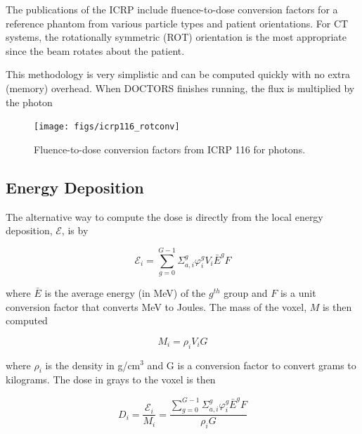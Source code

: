 The publications of the ICRP include fluence-to-dose conversion factors for a reference phantom from various particle types and patient orientations. For CT systems, the rotationally symmetric (ROT) orientation is the most appropriate since the beam rotates about the patient.

This methodology is very simplistic and can be computed quickly with no extra (memory) overhead. When DOCTORS finishes running, the flux is multiplied by the photon 

\begin{figure}[tb]
  \begin{center}
   \texttt{[image: figs/icrp116\_rotconv]}
  \end{center}
  \caption{Fluence-to-dose conversion factors from ICRP 116 for photons.}
\label{fig:icrp116_rotconv}
\end{figure}

\subsection{Energy Deposition}

The alternative way to compute the dose is directly from the local energy deposition, $\mathcal{E}$, is by

\begin{equation}
\mathcal{E}_i = \sum_{g=0}^{G-1} \Sigma_{a,i}^g \varphi_i^g V_i \bar{E}^g F
\end{equation}

\noindent
where $\bar{E}$ is the average energy (in MeV) of the $g^{th}$ group and $F$ is a unit conversion factor that converts MeV to Joules. The mass of the voxel, $M$ is then computed

\begin{equation}
M_i = \rho_i V_i G
\end{equation}

\noindent
where $\rho_i$ is the density in g/cm$^3$ and G is a conversion factor to convert grams to kilograms. The dose in grays to the voxel is then

\begin{equation}
D_i = \frac{\mathcal{E}_i}{M_i} = \frac{\sum_{g=0}^{G-1} \Sigma_{a,i}^g \varphi_i^g \bar{E}^g F}{\rho_i G}
\end{equation}

\endinput
